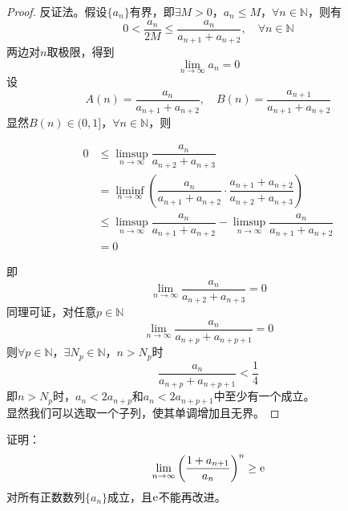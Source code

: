 \begin{proof}
    
    反证法。假设$\{a_n\}$有界，即$\exists M > 0$，$a_n \leq M$，$\forall n \in \mathbb{N}$，则有
    \[0 < \dfrac{a_n}{2M} \leq \dfrac{a_n}{a_{n + 1} + a_{n + 2}}, \quad \forall n \in \mathbb{N}\]
    两边对$n$取极限，得到
    \[\lim\limits_{n \to \infty}{a_n} = 0\]
    设
    \[A(n) = \dfrac{a_n}{a_{n + 1} + a_{n + 2}}, \quad B(n) = \dfrac{a_{n + 1}}{a_{n + 1} + a_{n + 2}}\]
    显然$B(n) \in (0, 1]$，$ \forall n \in \mathbb{N}$，则
    
    \begin{align*}
        0 & \leq \limsup_{n \to \infty}{\dfrac{a_n}{a_{n + 2} + a_{n + 3}}} \\
        & = \liminf_{n \to \infty}{\left( \dfrac{a_n}{a_{n + 1} + a_{n + 2}} \cdot \dfrac{a_{n + 1} + a_{n + 2}}{a_{n + 2} + a_{n + 3}} \right)} \\
        & \leq \limsup_{n \to \infty}{\dfrac{a_n}{a_{n + 1} + a_{n + 2}}} - \limsup_{n \to \infty}{\dfrac{a_n}{a_{n + 1} + a_{n + 2}}} \\
        & = 0
    \end{align*}
    
    即
    \[\lim\limits_{n \to \infty}{\dfrac{a_n}{a_{n + 2} + a_{n + 3}}} = 0\]
    同理可证，对任意$p \in \mathbb{N}$
    \[\lim\limits_{n \to \infty}{\dfrac{a_n}{a_{n + p} + a_{n + p + 1}}} = 0\]
    则$\forall p \in \mathbb{N}$，$\exists N_p \in \mathbb{N}$，$n > N_p$时
    \[\dfrac{a_n}{a_{n + p} + a_{n + p + 1}} < \dfrac{1}{4}\]
    即$n > N_p$时，$a_n < 2a_{n + p}$和$a_n < 2a_{n + p + 1}$中至少有一个成立。\\
    显然我们可以选取一个子列，使其单调增加且无界。
    
\end{proof}

\begin{proposition}

    证明：
    \[\lim\limits_{n \to \infty}{\left( \dfrac{1 + a_{n + 1}}{a_n} \right)^n} \geq \mathrm{e}\]
    对所有正数数列$\{a_n\}$成立，且$\mathrm{e}$不能再改进。

\end{proposition}

